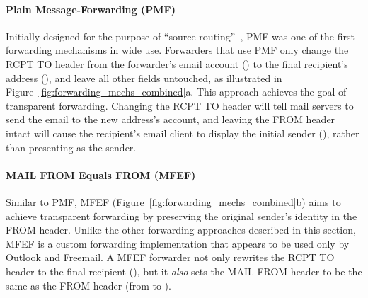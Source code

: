 
\paragraph{Plain Message-Forwarding (PMF)}
Initially designed for
the purpose of ``source-routing''~\cite{Emailfor45:online}, PMF was
one of the first forwarding mechanisms in wide use.
Forwarders that use PMF only change
the \textsc{RCPT TO} header from the forwarder's email account () to the final recipient's address (), and leave all other fields
untouched,
as illustrated in Figure~\ref{fig:forwarding_mechs_combined}a.
This approach achieves the goal of transparent forwarding.
Changing the \textsc{RCPT TO} header will tell mail servers to send the email to the new address's account, and leaving the \textsc{FROM} header intact will
cause the recipient's email client to display the initial sender (),
rather than presenting  as the sender.


\paragraph{MAIL FROM Equals FROM (MFEF)}
Similar to PMF, MFEF (Figure~\ref{fig:forwarding_mechs_combined}b) aims to achieve transparent forwarding by preserving the original sender's identity in the \textsc{FROM} header.
Unlike the other forwarding approaches described in this section, MFEF is a custom forwarding implementation that appears to be used only by Outlook and Freemail.
A MFEF forwarder not only rewrites the \textsc{RCPT TO} header to the final recipient (), but it \emph{also} sets the \textsc{MAIL FROM}
header to be the same as the \textsc{FROM} header (from  to ).

